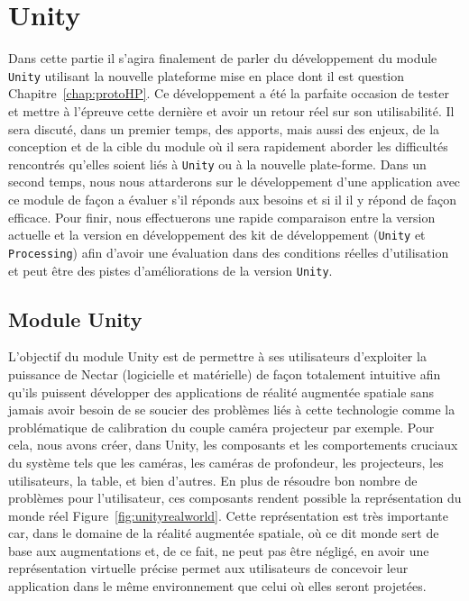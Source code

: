 \chapter{Unity}
\label{chap:unity}

Dans cette partie il s'agira finalement de parler du développement du module \texttt{Unity} utilisant la nouvelle plateforme mise en place dont il est question Chapitre~\ref{chap:protoHP}. Ce développement a été la parfaite occasion de tester et mettre à l'épreuve cette dernière et avoir un retour réel sur son utilisabilité.
Il sera discuté, dans un premier temps, des apports, mais aussi des enjeux, de la conception et de la cible du module où il sera rapidement aborder les difficultés rencontrés qu'elles soient liés à \texttt{Unity} ou à la nouvelle plate-forme. 
Dans un second temps, nous nous attarderons sur le développement d'une application avec ce module de façon a évaluer s'il réponds aux besoins et si il il y répond de façon efficace.
Pour finir, nous effectuerons une rapide comparaison entre la version actuelle et la version en développement des kit de développement (\texttt{Unity} et \texttt{Processing}) afin d'avoir une évaluation dans des conditions réelles d'utilisation et peut être des pistes d'améliorations de la version \texttt{Unity}.

\section{Module Unity}

L'objectif du module Unity est de permettre à ses utilisateurs d'exploiter la puissance de Nectar (logicielle et matérielle) de façon totalement intuitive afin qu'ils puissent développer des applications de réalité augmentée spatiale sans jamais avoir besoin de se soucier des problèmes liés à cette technologie comme la problématique de calibration du couple caméra projecteur par exemple.
Pour cela, nous avons créer, dans Unity, les composants et les comportements cruciaux du système tels que les caméras, les caméras de profondeur, les projecteurs, les utilisateurs, la table, et bien d'autres. En plus de résoudre bon nombre de problèmes pour l'utilisateur, ces composants rendent possible la représentation du monde réel Figure~\ref{fig:unityrealworld}. Cette représentation est très importante car, dans le domaine de la réalité augmentée spatiale, où ce dit monde sert de base aux augmentations et, de ce fait, ne peut pas être négligé, en avoir une représentation virtuelle précise permet aux utilisateurs de concevoir leur application dans le même environnement que celui où elles seront projetées.

